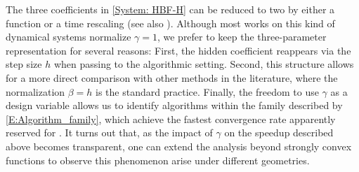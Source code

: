 \documentclass[pdflatex,sn-mathphys-num]{sn-jnl}
\theoremstyle{thmstyleone}
\theoremstyle{thmstyletwo}
\theoremstyle{thmstylethree}
\begin{document}
The three coefficients in \eqref{System: HBF-H} can be reduced to two by either a function or a time rescaling (see also \cite{Attouch_2019_proximal,Attouch_2022_rescaling}). Although most works on this kind of dynamical systems normalize $\gamma=1$, we prefer to keep the three-parameter representation for several reasons: First, the hidden coefficient reappears via the step size $h$ when passing to the algorithmic setting. Second, this structure allows for a more direct comparison with other methods in the literature, where the normalization $\beta=h$ is the standard practice. Finally, the freedom to use $\gamma$ as a design variable allows us to identify algorithms within the family described by \eqref{E:Algorithm_family}, which achieve the fastest convergence rate apparently reserved for \cite{Scoy_2018,Taylor_2023_optimal}. It turns out that, as the impact of $\gamma$ on the speedup described above becomes transparent, one can extend the analysis beyond strongly convex functions to observe this phenomenon arise under different geometries. \\
\end{document}
